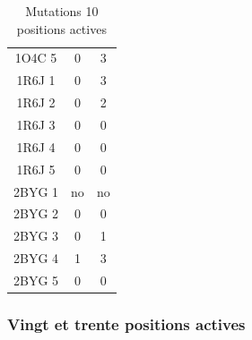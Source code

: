 \begin{table}[h]
\begin{tabular}{|c|c|c|}
        1O4C 5 & 0  & 3 \\
        1R6J 1 & 0  & 3 \\
        1R6J 2 & 0  & 2 \\
        1R6J 3 & 0  & 0 \\
        1R6J 4 & 0  & 0 \\
        1R6J 5 & 0  & 0 \\
        2BYG 1 & no & no \\ 
        2BYG 2 & 0  & 0 \\
        2BYG 3 & 0  & 1 \\
        2BYG 4 & 1  & 3 \\
        2BYG 5 & 0  & 0 \\
        
        \hline

 \end{tabular}      
 \caption{Mutations 10 positions actives }
 \label{tab_echec2BYG__1}      
\end{table}



   \subsubsection{ Vingt et trente positions actives}


